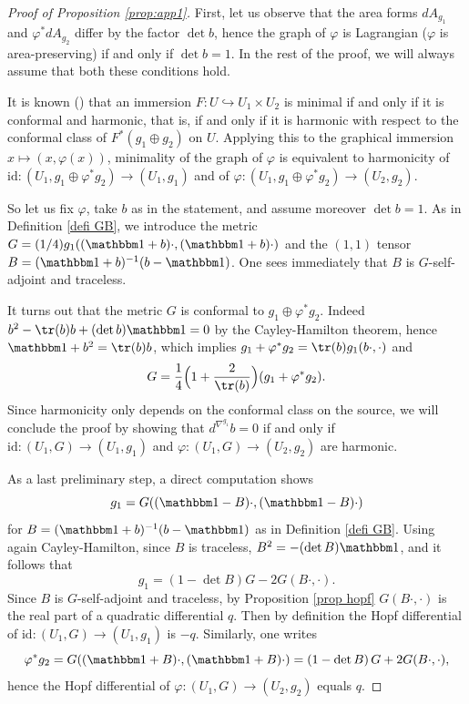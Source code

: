 \begin{proof}[Proof of Proposition \ref{prop:app1}]
First, let us observe that the area forms $dA_{g_1}$ and $\varphi^*dA_{g_2}$ differ by the factor $\det b$, hence the graph of $\varphi$ is Lagrangian (\ie $\varphi$ is area-preserving) if and only if $\det b=1$. In the rest of the proof, we will always assume that both these conditions hold.

It is known (\cite[\S 4]{zbMATH03198580}) that an immersion $F:U\hookrightarrow U_1\times U_2$ is minimal if and only if it is conformal and harmonic, that is, if and only if it is harmonic with respect to the conformal class of $F^*(g_1\oplus g_2)$ on $U$. Applying this to the graphical immersion $x\mapsto (x,\varphi(x))$, minimality of the graph of $\varphi$ is equivalent to harmonicity of $\mathrm{id}:(U_1,g_1\oplus \varphi^*g_2)\to (U_1,g_1)$ and of $\varphi:(U_1,g_1\oplus \varphi^*g_2)\to (U_2,g_2)$.

So let us fix $\varphi$, take $b$ as in the statement, and assume moreover $\det b=1$. As in Definition \ref{defi GB}, we introduce the metric $G=(1/4)g_1((\mathbbm 1+b)\cdot,(\mathbbm 1+b)\cdot)$ and the $(1,1)$ tensor $B=(\mathbbm 1+b)^{-1}(b-\mathbbm 1)$. One sees immediately that $B$ is $G$-self-adjoint and traceless.

It turns out that the metric $G$ is conformal to $g_1\oplus\varphi^*g_2$. Indeed $b^2-\tr (b)b+(\det b)\mathbbm 1=0$ by the Cayley-Hamilton theorem, hence $\mathbbm 1+b^2=\tr (b)b$, which implies $g_1+\varphi^*g_2=\tr (b)g_1(b\cdot,\cdot)$ and
\[
G=\frac{1}{4}\Bigl(1+\frac{2}{\tr (b)} \Bigr)(g_1+\varphi^*g_2).
\]
Since harmonicity only depends on the conformal class on the source, we will conclude the proof by showing that $d^{\nabla^{g_1}}\!b=0$ if and only if $\mathrm{id}:(U_1,G)\to (U_1,g_1)$ and $\varphi:(U_1,G)\to (U_2,g_2)$ are harmonic.

As a last preliminary step, a direct computation shows
\begin{equation}\label{eq:g1andG}
g_1=G((\mathbbm 1-B)\cdot,(\mathbbm 1-B)\cdot)
\end{equation}
for $B=(\mathbbm 1+b)^{-1}(b-\mathbbm 1)$ as in Definition \ref{defi GB}. Using again Cayley-Hamilton, since $B$ is traceless, $B^2=-(\det B)\mathbbm 1$, and it follows that
\[
g_1=\left(1-\det B\right)G-2G(B\cdot,\cdot).
\]
Since $B$ is $G$-self-adjoint and traceless, by Proposition \ref{prop hopf} $G(B\cdot,\cdot)$ is the real part of a quadratic differential $q$. Then by definition the Hopf differential of $\mathrm{id}:(U_1,G)\to (U_1,g_1)$ is $-q$. Similarly, one writes
\[
\varphi^*g_2=G((\mathbbm 1+B)\cdot,(\mathbbm 1+B)\cdot)=\left(1-\det B\right)G+2G(B\cdot,\cdot),
\]
hence the Hopf differential of $\varphi:(U_1,G)\to (U_2,g_2)$ equals $q$.


\end{proof}
